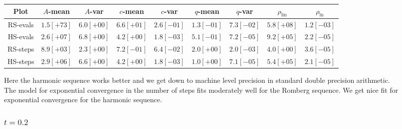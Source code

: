 \begin{table}[H]
    \centering\small
    \begin{tabular}{c||c|c|c|c|c|c|c|c}
Plot & \(A\)-mean & \(A\)-var & \(c\)-mean & \(c\)-var & \(q\)-mean & \(q\)-var & \(\rho_{\operatorname{lin}}\) & \(\rho_{\ln}\)\\\hline
\rowcolor{red}
RS-evals & \(1.5[+73]\) & \(6.0[+00]\) & \(6.6[+01]\) & \(2.6[-01]\) & \(1.3[-01]\) & \(7.3[-02]\) & \(5.8[+08]\) & \(1.2[-03]\) \\
\rowcolor{green}
HS-evals & \(2.6[+07]\) & \(6.8[+00]\) & \(4.2[+00]\) & \(1.8[-03]\) & \(5.1[-01]\) & \(7.2[-05]\) & \(9.2[+05]\) & \(2.2[-05]\) \\
\rowcolor{green}
RS-steps & \(8.9[+03]\) & \(2.3[+00]\) & \(7.2[-01]\) & \(6.4[-02]\) & \(2.0[+00]\) & \(2.0[-03]\) & \(4.0[+00]\) & \(3.6[-05]\) \\
\rowcolor{green}
HS-steps & \(2.9[+06]\) & \(6.6[+00]\) & \(4.2[+00]\) & \(1.8[-03]\) & \(1.0[+00]\) & \(7.1[-05]\) & \(5.4[+05]\) & \(2.1[-05]\) \\
    \end{tabular}
    \label{tab:my_label}
\end{table}

Here the harmonic sequence works better and we get down to machine level precision in standard double precision arithmetic.\\

The model for exponential convergence in the number of steps fits moderately well for the Romberg sequence. We get nice fit for exponential convergence for the harmonic sequence.

\subsubsection{\(t = 0.2\)}

